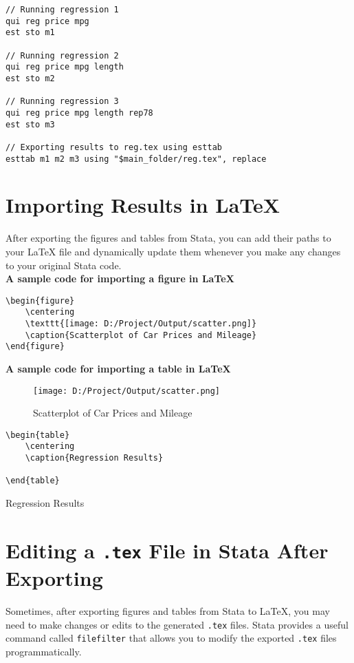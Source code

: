\documentclass{article}
\begin{document}
\begin{verbatim}
// Running regression 1
qui reg price mpg
est sto m1

// Running regression 2
qui reg price mpg length
est sto m2

// Running regression 3
qui reg price mpg length rep78
est sto m3

// Exporting results to reg.tex using esttab
esttab m1 m2 m3 using "$main_folder/reg.tex", replace
\end{verbatim}

\section{Importing Results in {\LaTeX}}
After exporting the figures and tables from Stata, you can add their paths to your {\LaTeX} file and dynamically update them whenever you make any changes to your original Stata code.\\

\textbf{A sample code for importing a figure in {\LaTeX}} 
\begin{verbatim}
\begin{figure}
    \centering
    \texttt{[image: D:/Project/Output/scatter.png]}
    \caption{Scatterplot of Car Prices and Mileage}
\end{figure}
\end{verbatim}

\textbf{A sample code for importing a table in {\LaTeX}} 
\begin{figure}
    \centering
    \texttt{[image: D:/Project/Output/scatter.png]}
    \caption{Scatterplot of Car Prices and Mileage}
\end{figure}

\begin{verbatim}
\begin{table}
    \centering
    \caption{Regression Results}
    
\end{table}
\end{verbatim}

\begin{table}
    \centering
    \caption{Regression Results}
    
\end{table}

\newpage
\section{Editing a \texttt{.tex} File in Stata After Exporting}
Sometimes, after exporting figures and tables from Stata to \LaTeX, you may need to make changes or edits to the generated \texttt{.tex} files. Stata provides a useful command called \texttt{filefilter} that allows you to modify the exported \texttt{.tex} files programmatically.
\end{document}
